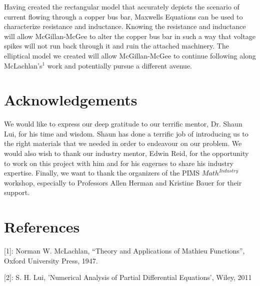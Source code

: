 \documentclass[11pt]{article}
\begin{document}
Having created the rectangular model that accurately depicts the
scenario of current flowing through a copper bus bar, Maxwells Equations
can be used to characterize resistance and inductance. Knowing the
resistance and inductance will allow McGillan-McGee to alter the copper
bus bar in such a way that voltage spikes will not run back through it
and ruin the attached machinery. The elliptical model we created will
allow McGillan-McGee to continue following along McLachlan's\(^1\) work
and potentially pursue a different avenue.

\section{Acknowledgements}

We would like to express our deep gratitude to our terrific mentor, Dr. Shaun Lui, for his time and wisdom.
Shaun has done a terrific job of introducing us to the right materials that we needed in order to endeavour on our problem.
We would also wish to thank  our industry mentor, Edwin Reid, for the opportunity to work on this project with him
and  for his eagernes to share his industry expertise. Finally, we want to thank the organizers of the PIMS $Math^{Industry}$ workshop, 
especially to Professors Allen Herman and Kristine Bauer for their support. 

\section{References}

{[}1{]}: Norman W. McLachlan, ``Theory and Applications of Mathieu
Functions'', Oxford University Press, 1947.

{[}2{]}: S. H. Lui, 'Numerical Analysis of Partial Differential Equations', Wiley, 2011



    
    
    
\end{document}

